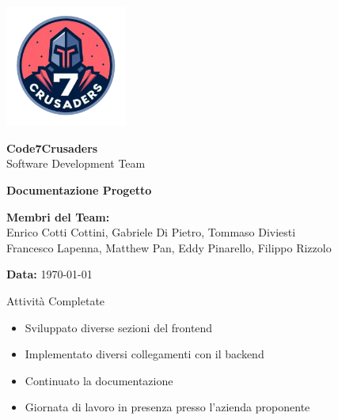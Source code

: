 \documentclass{beamer}
\begin{document}
\begin{frame}[plain] %
    \centering
    \vspace*{2cm}
    
    \includegraphics[width=0.3\textwidth]{../img/logo/7Crusaders_logo.png} %
    \vspace{1cm}
    
    {\Huge \textbf{Code7Crusaders}}\\
    \vspace{0.5cm}
    {\Large Software Development Team}\\
    \vspace{2cm}
    
    {\large \textbf{Documentazione Progetto}}\\
    \vspace{3cm}

    \textbf{Membri del Team:}\\
    Enrico Cotti Cottini, Gabriele Di Pietro, Tommaso Diviesti \\
    Francesco Lapenna, Matthew Pan, Eddy Pinarello, Filippo Rizzolo \\
    \vspace{1cm}
    
    {\large \textbf{Data:}} \today\\
    
    \vspace{1cm}
\end{frame}

\begin{frame}
    \begin{exampleblock}{Attività Completate}
        \begin{itemize}
            \item Sviluppato diverse sezioni del frontend 
            \item Implementato diversi collegamenti con il backend 
            \item Continuato la documentazione 
            \item Giornata di lavoro in presenza presso l’azienda proponente
        \end{itemize}
    \end{exampleblock}
\end{frame}
\end{document}
